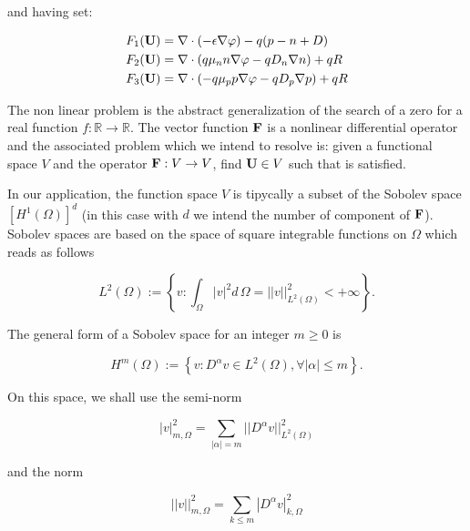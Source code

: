 and having set:

\begin{align*}
F_1(\mathbf{U}) & = \nabla \cdot (-\epsilon \nabla \varphi) - q(p-n+D) \\
F_2(\mathbf{U}) & = \nabla \cdot ( q\mu_n n \nabla \varphi - qD_n \nabla n )+qR \\
F_3(\mathbf{U}) & = \nabla \cdot (- q\mu_p p \nabla \varphi - qD_p \nabla p )+qR
\end{align*}

The non linear problem  is the abstract generalization of the search of a zero for a real function $f:\mathbb{R}\rightarrow\mathbb{R}$. The vector function $\mathbf{F}$ is a nonlinear differential operator and the associated problem which we intend to resolve is: given a functional space $V$ and the operator $\mathbf{F}:V\rightarrow V$, find $\mathbf{U}\in V$ such that  is satisfied.

In our application, the function space $V$ is tipycally a subset of the Sobolev space  $[H^1(\Omega)]^d$ (in this case with $d$ we intend the number of component of $\mathbf{F}$). Sobolev spaces are based on the space of square integrable functions on $\Omega$ which reads as follows

\begin{equation}
\label{space: L2}
L^2(\Omega) := \left\{ v : \int_{\Omega} |v|^2 d\,\Omega =||v||^2_{L^2(\Omega)}<+\infty \right\}.
\end{equation}

The general form of a Sobolev space for an integer $m\geq 0$ is

\begin{equation}
\label{space: Hm}
H^m(\Omega) := \left\{ v : D^{\alpha}v\in L^2(\Omega),\forall |\alpha|\leq m \right\}.
\end{equation}

On this space, we shall use the semi-norm

\begin{equation}
\label{eq: semiorm sobolev}
|v|_{m,\Omega}^2 = \sum_{|\alpha|=m} ||D^{\alpha}v||^2_{L^2(\Omega)}
\end{equation}

and the norm

\begin{equation}
\label{eq: norm sobolev}
||v||_{m,\Omega}^2 = \sum_{k\leq m} |D^{\alpha}v|^2_{k,\Omega}
\end{equation}

